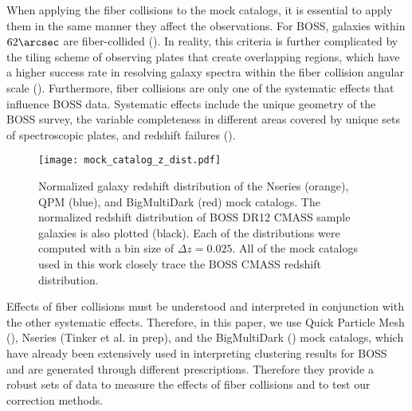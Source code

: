 When applying the fiber collisions to the mock catalogs, it is essential to 
apply them in the same manner they affect the observations. For BOSS, galaxies
within $62\arcsec$ are fiber-collided (\citealt{Anderson:2012aa}). In reality, 
this criteria is further complicated by the tiling scheme of observing 
plates that create overlapping regions, which have a higher success rate in 
resolving galaxy spectra within the fiber collision angular scale (\citealt{
Guo:2012aa, Reid:2012aa}). Furthermore, fiber collisions are only one of the 
systematic effects that influence BOSS data. Systematic effects include the 
unique geometry of the BOSS survey, the variable completeness in different areas  
covered by unique sets of spectroscopic plates, and redshift failures 
(\citealt{Anderson:2012aa, Ross:2012aa}). 

\def \cmasscolor{black}
\def \ldgcolor{blue}
\def \nseriescolor{orange}
\def \qpmcolor{blue}
\def \tmcolor{green}
\def \bmdcolor{red}

\begin{figure}
\begin{center}
\texttt{[image: mock\_catalog\_z\_dist.pdf]} 
\caption{Normalized galaxy redshift distribution of the Nseries (\nseriescolor), 
QPM (\qpmcolor), and BigMultiDark (\bmdcolor) mock catalogs. The 
normalized redshift distribution of BOSS DR12 CMASS sample galaxies 
is also plotted (\cmasscolor). Each of the distributions were computed
with a bin size of $\Delta z = 0.025$. All of the mock catalogs used 
in this work closely trace the BOSS CMASS redshift distribution.}
\label{fig:zdist}
\end{center}
\end{figure}

Effects of fiber collisions must be understood and interpreted in conjunction 
with the other systematic effects. Therefore, in this paper, we use Quick 
Particle Mesh (\citealt{White:2014aa}), Nseries (Tinker et al. in prep), and 
the BigMultiDark (\citealt{Rodriguez-Torres:2015aa}) mock catalogs, which 
have already been extensively used in interpreting clustering results for  
BOSS and are generated through different prescriptions. Therefore they 
provide a robust sets of data to measure the effects of fiber collisions and 
to test our correction methods. 


